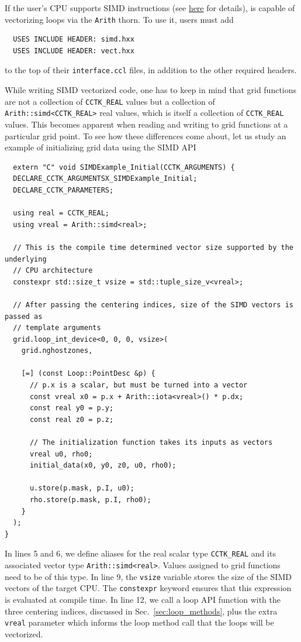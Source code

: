 If the user's CPU supports SIMD instructions (see \href{https://en.wikipedia.org/wiki/Single_instruction,_multiple_data}{here} for details), \CarpetX\space is capable of vectorizing loops via the \texttt{Arith} thorn. To use it, users must add
%
\begin{verbatim}
  USES INCLUDE HEADER: simd.hxx
  USES INCLUDE HEADER: vect.hxx
\end{verbatim}
%
to the top of their \texttt{interface.ccl} files, in addition to the other required headers.

While writing SIMD vectorized code, one has to keep in mind that grid functions are not a collection of \texttt{CCTK\_REAL} values but a collection of \texttt{Arith::simd<CCTK\_REAL>} real values, which is itself a collection of \texttt{CCTK\_REAL} values. This becomes apparent when reading and writing to grid functions at a particular grid point. To see how these differences come about, let us study an example of initializing grid data using the SIMD API
%
\begin{verbatim}
  extern "C" void SIMDExample_Initial(CCTK_ARGUMENTS) {
  DECLARE_CCTK_ARGUMENTSX_SIMDExample_Initial;
  DECLARE_CCTK_PARAMETERS;

  using real = CCTK_REAL;
  using vreal = Arith::simd<real>;
  
  // This is the compile time determined vector size supported by the underlying
  // CPU architecture
  constexpr std::size_t vsize = std::tuple_size_v<vreal>;

  // After passing the centering indices, size of the SIMD vectors is passed as
  // template arguments
  grid.loop_int_device<0, 0, 0, vsize>(
    grid.nghostzones,
    
    [=] (const Loop::PointDesc &p) {
      // p.x is a scalar, but must be turned into a vector
      const vreal x0 = p.x + Arith::iota<vreal>() * p.dx;
      const real y0 = p.y;
      const real z0 = p.z;
      
      // The initialization function takes its inputs as vectors
      vreal u0, rho0;
      initial_data(x0, y0, z0, u0, rho0);
      
      u.store(p.mask, p.I, u0);
      rho.store(p.mask, p.I, rho0);
    }
  );
}
\end{verbatim}

In lines 5 and 6, we define aliases for the real scalar type \texttt{CCTK\_REAL} and its associated vector type \texttt{Arith::simd<real>}. Values assigned to grid functions need to be of this type. In line 9, the \texttt{vsize} variable stores the size of the SIMD vectors of the target CPU. The \texttt{constexpr} keyword ensures that this expression is evaluated at compile time. In line 12, we call a loop API function with the three centering indices, discussed in Sec.~\ref{sec:loop_methods}, plus the extra \texttt{vreal} parameter which informs the loop method call that the loops will be vectorized.

